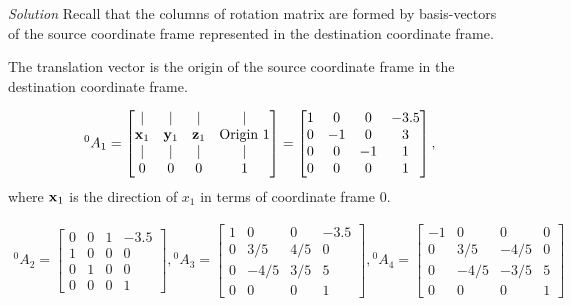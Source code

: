 \documentclass{article}
\numberwithin{prob}{section}
\newenvironment{solution}{\emph{Solution}}{}
\begin{document}
\begin{solution}
Recall that the columns of rotation matrix are formed by basis-vectors of the source coordinate frame represented in the destination coordinate frame.

The translation vector is the origin of the source coordinate frame in the destination coordinate frame.

\begin{align}
  {}^0A_1 = \begin{bmatrix}
    | & | & | & | \\
    \mathbf{x}_1 & \mathbf{y}_1 & \mathbf{z}_1 & \text{Origin 1} \\
    | & | & | & | \\
    0 & 0 & 0 & 1
  \end{bmatrix}
  = \begin{bmatrix}
    1 &  0 &  0 & -3.5 \\
    0 & -1 &  0 & 3\\
    0 &  0 & -1 & 1\\
    0 & 0 & 0 & 1
  \end{bmatrix}
  ,
\end{align}
where $\mathbf{x}_1$ is the direction of $x_1$ in terms of coordinate frame 0.

\begin{align}
  {}^0A_2 = \begin{bmatrix}
    0  & 0 &  1 & -3.5\\
    1  & 0 &  0 & 0\\
    0  & 1 &  0 & 0\\
    0  & 0 &  0 & 1
  \end{bmatrix}
  ,
  {}^0A_3 = \begin{bmatrix}
     1 &    0 &    0& -3.5\\
     0 &  3/5 &  4/5& 0\\
     0 & -4/5 &  3/5& 5\\
     0 & 0 &  0     & 1
  \end{bmatrix}
  ,
  {}^0A_4 = \begin{bmatrix}
     -1 &   0  &     0 & 0\\
      0 & 3/5  &  -4/5 & 0\\
      0 & -4/5 &  -3/5 & 5\\
      0 & 0    &  0 & 1
  \end{bmatrix}
\end{align}


\end{solution}
\end{document}
